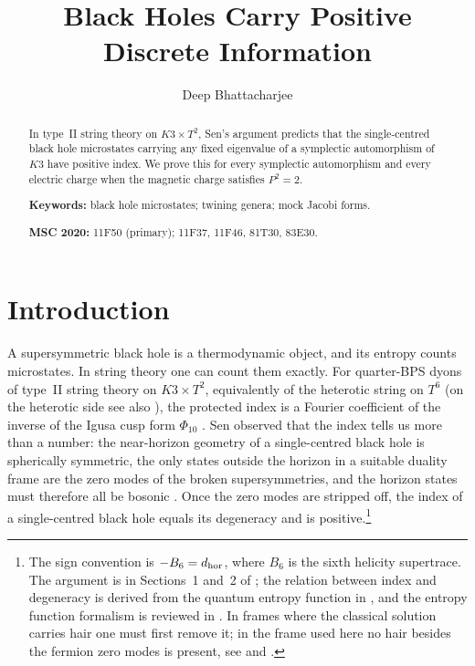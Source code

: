 \documentclass[11pt]{amsart}
\theoremstyle{definition}
\begin{document}
\title[Black holes carry positive discrete information]{Black Holes Carry Positive\\ Discrete Information}

\author{Deep Bhattacharjee}
\address{Formerly, Electro-Gravitational Space Propulsion Laboratory (EGSPL), Bhubaneswar, Odisha 751030, India}
\address{Formerly, University of Calcutta (Heramba Chandra College), 23/49 Gariahat Road, Golpark, Kolkata 700029, West Bengal, India}

\begin{abstract}
In type~II string theory on $K3\times T^2$, Sen's argument predicts that the single-centred black hole microstates carrying any fixed eigenvalue of a symplectic automorphism of $K3$ have positive index. We prove this for every symplectic automorphism and every electric charge when the magnetic charge satisfies $P^2=2$.

\medskip\noindent\textbf{Keywords:} black hole microstates; twining genera; mock Jacobi forms.

\smallskip\noindent\textbf{MSC 2020:} 11F50 (primary); 11F37, 11F46, 81T30, 83E30.
\end{abstract}

\maketitle

\section{Introduction}\label{sec:intro}

A supersymmetric black hole is a thermodynamic object, and its entropy counts microstates. In string theory one can count them exactly. For quarter-BPS dyons of type~II string theory on $K3\times T^2$, equivalently of the heterotic string on $T^6$ (on the heterotic side see also \cite{SBBT26}), the protected index is a Fourier coefficient of the inverse of the Igusa cusp form $\Phi_{10}$ \cite{DVV97}. Sen observed that the index tells us more than a number: the near-horizon geometry of a single-centred black hole is spherically symmetric, the only states outside the horizon in a suitable duality frame are the zero modes of the broken supersymmetries, and the horizon states must therefore all be bosonic \cite{Sen11}. Once the zero modes are stripped off, the index of a single-centred black hole equals its degeneracy and is positive.\footnote{The sign convention is $-B_6=d_{\rm hor}$, where $B_6$ is the sixth helicity supertrace. The argument is in Sections~1 and~2 of \cite{Sen11}; the relation between index and degeneracy is derived from the quantum entropy function in \cite{DGMS11}, and the entropy function formalism is reviewed in \cite{Sen08}. In frames where the classical solution carries hair one must first remove it; in the frame used here no hair besides the fermion zero modes is present, see \cite{CD21} and \cite[Section~1]{GSSV23}.}
\end{document}
